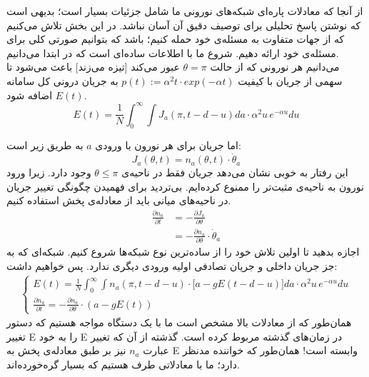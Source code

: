 
	\label{chap:analytics}

از آنجا که معادلات پاره‌ای شبکه‌های نورونی ما شامل جزئیات بسیار است؛ بدیهی است که نوشتن پاسخ تحلیلی برای توصیف دقیق آن آسان نباشد. در این بخش تلاش می‌کنیم که از جهات متفاوت به مسئله‌ی خود حمله کنیم؛ باشد که بتوانیم صورتی کلی برای مسئله‌ی خود ارائه دهیم. شروع ما با اطلاعات ساده‌ای است که در ابتدا می‌دانیم.\\

می‌دانیم هر نورونی که از حالت $\theta = \pi$ عبور می‌کند [تیزه می‌زند] باعث می‌شود تا سهمی از جریان با کیفیت $p(t):= \alpha^2 t \cdot exp(-\alpha t)$ به جریان درونی کل سامانه $E(t)$ اضافه شود.
\begin{equation}
	E(t) = \frac{1}{N}\int_{0}^{\infty} \int J_a (\pi,t-d-u) da \cdot \alpha^2 u\, e^{-\alpha u} du 
	\label{eq:general_field}
\end{equation}

اما جریان برای هر نورون با ورودی $a$ به طریق زیر است:
\begin{equation}
	J_a (\theta, t) = n_a(\theta,t) \cdot \dot \theta_a
\end{equation}
این رفتار به خوبی نشان می‌دهد جریان فقط در ناحیه‌ی $\theta \leq \pi$ وجود دارد. زیرا ورود نورون به ناحیه‌ی مثبت‌تر را ممنوع کرده‌ایم.  بی‌تردید برای فهمیدن چگونگی تغییر جریان در ناحیه‌های میانی باید از معادله‌ی پخش استفاده کنیم.
\begin{align}
	\frac{\partial n_a}{\partial t} &= - \frac{\partial J_a}{\partial \theta} \label{eq:continuity_relation}\\
	&= - \frac{\partial n_a}{\partial \theta} \cdot \dot \theta_a
\end{align}
اجازه بدهید تا اولین تلاش خود را از ساده‌ترین نوع شبکه‌ها شروع کنیم. شبکه‌ای که به جز جریان داخلی و جریان تصادفی اولیه ورودی دیگری ندارد. پس خواهیم داشت:
\begin{align}
	\begin{cases}
		E(t) = \frac{1}{N} \int_{0}^{\infty} \int n_a(\pi,t-d-u) \cdot \big[ a - g E(t-d-u) \big] da \cdot \alpha^2 u\, e^{-\alpha u} du \\
		\frac{\partial n_a}{\partial t} = - \frac{\partial n_a}{\partial \theta} \cdot (a - g E(t) )
	\end{cases}
	\label{eq:simple_network}
\end{align}
همان‌طور که از معادلات بالا مشخص است ما با یک دستگاه مواجه هستیم که دستور تغییر E را به خود E در زمان‌های گذشته مربوط کرده است. گذشته از آن که تغییر عبارت
$n_a$
نیز بر طبق معادله‌ی پخش به E وابسته است! همان‌طور که خواننده مدنظر دارد؛ ما با معادلاتی طرف هستیم که بسیار گره‌خورده‌اند.\\

